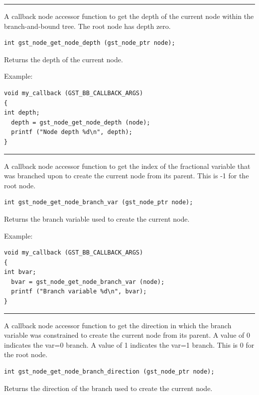 \hrule
\vskip 0.25in
A callback node accessor function to get the depth of the current
node within the branch-and-bound tree.  The root node has depth
zero.

\begin{verbatim}
int gst_node_get_node_depth (gst_node_ptr node);

\end{verbatim}
Returns the depth of the current node.

\bigskip{}Example:
{\footnotesize
\begin{verbatim}
void my_callback (GST_BB_CALLBACK_ARGS)
{
int	depth;
  depth = gst_node_get_node_depth (node);
  printf ("Node depth %d\n", depth);
}
\end{verbatim}
}
\clearpage{}
\label{gst_node_get_node_branch_var}

\hrule
\vskip 0.25in
A callback node accessor function to get the index of the
fractional variable that was branched upon to create the current
node from its parent.  This is -1 for the root node.

\begin{verbatim}
int gst_node_get_node_branch_var (gst_node_ptr node);

\end{verbatim}
Returns the branch variable used to create the current node.

\bigskip{}Example:
{\footnotesize
\begin{verbatim}
void my_callback (GST_BB_CALLBACK_ARGS)
{
int	bvar;
  bvar = gst_node_get_node_branch_var (node);
  printf ("Branch variable %d\n", bvar);
}
\end{verbatim}
}
\clearpage{}
\label{gst_node_get_node_branch_direction}

\hrule
\vskip 0.25in
A callback node accessor function to get the direction in which
the branch variable was constrained to create the current node
from its parent.  A value of 0 indicates the var=0 branch.  A
value of 1 indicates the var=1 branch.  This is 0 for the root
node.

\begin{verbatim}
int gst_node_get_node_branch_direction (gst_node_ptr node);

\end{verbatim}
Returns the direction of the branch used to create the current node.

